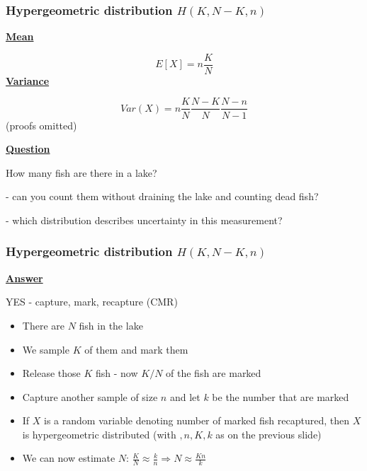 \documentclass[t,8pt]{beamer}%
\begin{document}
    \begin{frame}
	\frametitle{Hypergeometric distribution $H(K,N-K,n)$}
        {\bf\underline{Mean}} \par
        $$E[X]=n\frac KN$$
        {\bf\underline{Variance}} \par
        $$Var(X)=n\frac KN\frac{N-K}N\frac{N-n}{N-1}$$
        (proofs omitted) \par 
        {\bf\underline{Question}} \par
        How many fish are there in a lake? \par
        - can you count them without draining the lake and counting dead fish? \par 
        - which distribution describes uncertainty in this measurement?
    \end{frame}

    \begin{frame}
	\frametitle{Hypergeometric distribution $H(K,N-K,n)$}
        {\bf\underline{Answer}} \par
        YES - capture, mark, recapture (CMR) \par
        \begin{itemize}
            \item There are $N$ fish in the lake
            \item We sample $K$ of them and mark them
            \item Release those $K$ fish - now $K/N$ of the fish are marked
            \item Capture another sample of size $n$ and let $k$ be the number that are marked
            \item If $X$ is a random variable denoting number of marked fish recaptured, then $X$ is hypergeometric distributed (with $,n,K,k$ as on the previous slide)
            \item We can now estimate $N$: $\frac KN\approx \frac kn\Rightarrow N\approx \frac{Kn}k$
        \end{itemize}
    \end{frame}
\end{document}
